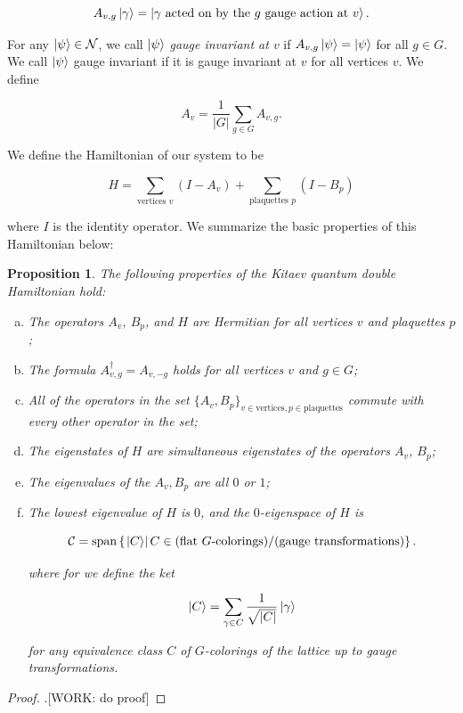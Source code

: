 \documentclass{article}
\newtheorem{proposition}{Proposition}[section]
\theoremstyle{definition}
\newcommand{\NN}{\mathcal{N}}
\newcommand{\Cc}{\mathcal{C}}
\newcommand{\0}{\left|0\right>}
\newcommand{\1}{\left|1\right>}
\numberwithin{figure}{section}
\begin{document}
$$A_{v,g}\ket{\gamma}=\ket{\gamma \text{ acted on by the $g$ gauge action at $v$}}.$$

For any $\ket{\psi}\in \NN$, we call $\ket{\psi}$ \textit{gauge invariant at $v$} if $A_{v,g}\ket{\psi}=\ket{\psi}$ for all $g\in G$. We call $\ket{\psi}$ gauge invariant if it is gauge invariant at $v$ for all vertices $v$. We define

$$A_v=\frac{1}{|G|}\sum_{g\in G}A_{v,g}.$$

We define the Hamiltonian of our system to be

$$H=\sum_{\text{vertices $v$}}(I-A_v)+\sum_{\text{plaquettes $p$}}(I-B_p)$$

where $I$ is the identity operator. We summarize the basic properties of this Hamiltonian below:

\begin{proposition} The following properties of the Kitaev quantum double Hamiltonian hold:

\begin{enumerate}[(a)]
\item The operators $A_v$, $B_p$, and $H$ are Hermitian for all vertices $v$ and plaquettes $p$;
\item The formula $A_{v,g}^{\dagger}=A_{v,-g}$ holds for all vertices $v$ and $g\in G$;
\item All of the operators in the set $\{A_v,B_p\}_{v\in \text{vertices}, p\in \text{plaquettes}}$ commute with every other operator in the set;
\item The eigenstates of $H$ are simultaneous eigenstates of the operators $A_v$, $B_p$;
\item The eigenvalues of the $A_v,B_p$ are all $0$ or $1$;
\item The lowest eigenvalue of $H$ is $0$, and the $0$-eigenspace of $H$ is

$$\Cc=\text{span}\left\{\left.\ket{C}\right| C\in \text{(flat $G$-colorings)}/\text{(gauge transformations)}\right\}.$$

where for we define the ket

$$\ket{C}=\sum_{\gamma \in C}\frac{1}{\sqrt{|C|}}\ket{\gamma}$$

for any equivalence class $C$ of $G$-colorings of the lattice up to gauge transformations.

\end{enumerate}
\end{proposition}
\begin{proof}.[WORK: do proof]
\end{proof}
\end{document}
